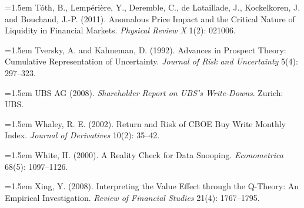 \hangindent=1.5em T\'oth, B., Lemp\'eri\`ere, Y., Deremble, C., de Lataillade, J., Kockelkoren, J. and Bouchaud, J.-P. (2011). Anomalous Price Impact and the Critical Nature of Liquidity in Financial Markets. \emph{Physical Review X} 1(2): 021006.

\hangindent=1.5em Tversky, A. and Kahneman, D. (1992). Advances in Prospect Theory: Cumulative Representation of Uncertainty. \emph{Journal of Risk and Uncertainty} 5(4): 297--323.

\hangindent=1.5em UBS AG (2008). \emph{Shareholder Report on UBS's Write-Downs}. Zurich: UBS.

\hangindent=1.5em Whaley, R. E. (2002). Return and Risk of CBOE Buy Write Monthly Index. \emph{Journal of Derivatives} 10(2): 35--42.

\hangindent=1.5em White, H. (2000). A Reality Check for Data Snooping. \emph{Econometrica} 68(5): 1097--1126.

\hangindent=1.5em Xing, Y. (2008). Interpreting the Value Effect through the Q-Theory: An Empirical Investigation. \emph{Review of Financial Studies} 21(4): 1767--1795.

\endgroup
